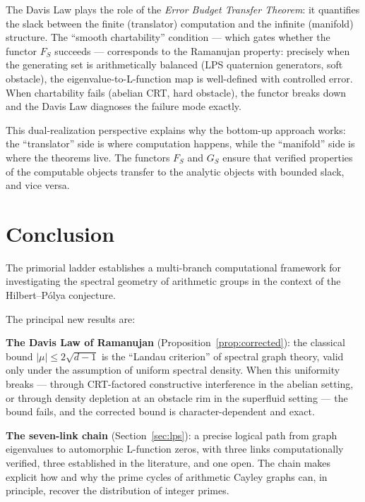 \documentclass[12pt,reqno]{amsart}
\theoremstyle{plain}
\theoremstyle{definition}
\theoremstyle{remark}
\begin{document}
The Davis Law plays the role of the \emph{Error Budget Transfer
Theorem}: it quantifies the slack between the finite (translator)
computation and the infinite (manifold) structure.  The ``smooth
chartability'' condition --- which gates whether the functor $F_S$
succeeds --- corresponds to the Ramanujan property: precisely when the
generating set is arithmetically balanced (LPS quaternion generators,
soft obstacle), the eigenvalue-to-L-function map is well-defined with
controlled error.  When chartability fails (abelian CRT, hard
obstacle), the functor breaks down and the Davis Law diagnoses the
failure mode exactly.

This dual-realization perspective explains why the bottom-up
approach works: the ``translator'' side is where computation happens,
while the ``manifold'' side is where the theorems live.  The functors
$F_S$ and $G_S$ ensure that verified properties of the computable
objects transfer to the analytic objects with bounded slack, and vice
versa.


\section{Conclusion}\label{sec:conclusion}

The primorial ladder establishes a multi-branch computational
framework for investigating the spectral geometry of arithmetic groups
in the context of the Hilbert--P\'olya conjecture.

The principal new results are:

\textbf{The Davis Law of Ramanujan}
(Proposition~\ref{prop:corrected}): the classical bound $|\mu| \leq
2\sqrt{d-1}$ is the ``Landau criterion'' of spectral graph theory,
valid only under the assumption of uniform spectral density.  When
this uniformity breaks --- through CRT-factored constructive
interference in the abelian setting, or through density depletion at
an obstacle rim in the superfluid setting --- the bound fails, and the
corrected bound is character-dependent and exact.

\textbf{The seven-link chain} (Section~\ref{sec:lps}): a precise
logical path from graph eigenvalues to automorphic L-function zeros,
with three links computationally verified, three established in the
literature, and one open.  The chain makes explicit how and why the
prime cycles of arithmetic Cayley graphs can, in principle, recover
the distribution of integer primes.
\end{document}
